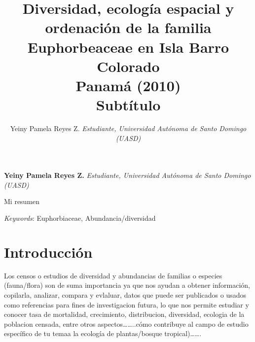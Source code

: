 \documentclass[11pt,]{article}
\title{Diversidad, ecología espacial y ordenación de la familia Euphorbeaceae
en Isla Barro Colorado\\
Panamá (2010)\\
Subtítulo  }
\author{\Large Yeiny Pamela Reyes Z.\vspace{0.05in} \newline\normalsize\emph{Estudiante, Universidad Autónoma de Santo Domingo (UASD)}  }
\date{}
\newcommand*{\authorfont}{\fontfamily{phv}\selectfont}
\renewenvironment{abstract}
 {{%
    \setlength{\leftmargin}{0mm}
    \setlength{\rightmargin}{\leftmargin}%
  }%
  \relax}
 {\endlist}
\begin{document}
	
%

{%
\setlength{\parindent}{0pt}
\thispagestyle{plain}
{\fontsize{18}{20}\selectfont\raggedright 
\maketitle  %

}

{
   \vskip 13.5pt\relax \normalsize\fontsize{11}{12} 
\textbf{\authorfont Yeiny Pamela Reyes Z.} \hskip 15pt \emph{\small Estudiante, Universidad Autónoma de Santo Domingo (UASD)}   

}

}








\begin{abstract}

    \hbox{\vrule height .2pt width 39.14pc}

    \vskip 8.5pt %

\noindent Mi resumen


\vskip 8.5pt \noindent \emph{Keywords}: Euphorbiaceae, Abundancia/diversidad \par

    \hbox{\vrule height .2pt width 39.14pc}



\end{abstract}


\vskip 6.5pt


\noindent  \section{Introducción}\label{introducciuxf3n}

Los censos o estudios de diversidad y abundancias de familias o especies
(fauna/flora) son de suma importancia ya que nos ayudan a obtener
información, copilarla, analizar, compara y evlaluar, datos que puede
ser publicados o usados como referencias para fines de investigacion
futura, lo que nos permite estudiar y conocer tasa de mortalidad,
crecimiento, distribucion, diversidad, ecologia de la poblacion censada,
entre otros aspectos\ldots{}\ldots{}..cómo contribuye al campo de
estudio específico de tu temaa la ecología de plantas/bosque
tropical)\ldots{}\ldots{}.
\end{document}
